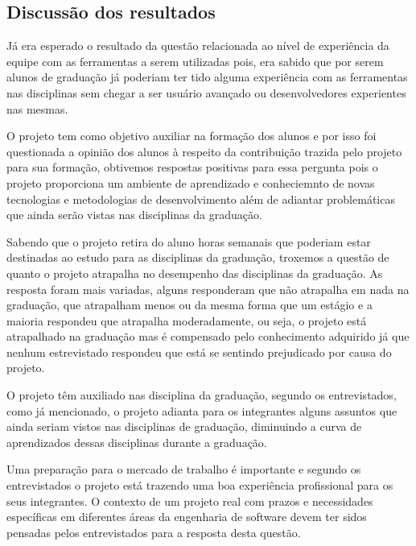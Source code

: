 \subsection{Discussão dos resultados}

Já era esperado o resultado da questão relacionada ao nível de experiência da equipe com as ferramentas a serem utilizadas pois, era sabido que por serem alunos de graduação já poderiam ter tido alguma experiência com as ferramentas nas disciplinas sem chegar a ser usuário avançado ou desenvolvedores experientes nas mesmas.

O projeto tem como objetivo auxiliar na formação dos alunos e por isso foi questionada a opinião dos alunos à respeito da contribuição trazida pelo projeto para sua formação, obtivemos respostas positivas para essa pergunta pois o projeto proporciona um ambiente de aprendizado e conheciemnto de novas tecnologias e metodologias de desenvolvimento além de adiantar problemáticas que ainda serão vistas nas disciplinas da graduação.

Sabendo que o projeto retira do aluno horas semanais que poderiam estar destinadas ao estudo para as disciplinas da graduação, troxemos a questão de quanto o projeto atrapalha no desempenho das disciplinas da graduação. As resposta foram mais variadas, alguns responderam que não atrapalha em nada na graduação, que atrapalham menos ou da mesma forma que um estágio e a maioria respondeu que atrapalha moderadamente, ou seja, o projeto está atrapalhado na graduação mas é compensado pelo conhecimento adquirido já que nenhum estrevistado respondeu que está se sentindo prejudicado por causa do projeto.

O projeto têm auxiliado nas disciplina da graduação, segundo os entrevistados, como já mencionado, o projeto adianta para os integrantes alguns assuntos que ainda seriam vistos nas disciplinas de graduação, diminuindo a curva de aprendizados dessas disciplinas durante a graduação.

Uma preparação para o mercado de trabalho é importante e segundo os entrevistados o projeto está trazendo uma boa experiência profissional para os seus integrantes. O contexto de um projeto real com prazos e necessidades específicas em diferentes áreas da engenharia de software devem ter sidos pensadas pelos entrevistados para a resposta desta questão. 